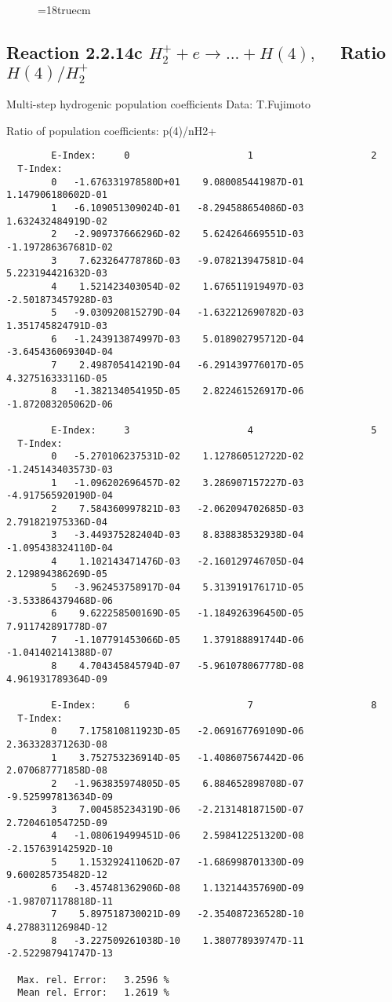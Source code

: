 \begin{figure} \label{2.2.14b}
\epsfxsize=18truecm
\end{figure}
\newpage

\subsection{
Reaction 2.2.14c $ H_2^+ + e \rightarrow ...+ H(4) , \quad  $
Ratio $H(4)/H_2^+  $
}

 Multi-step hydrogenic population coefficients
 Data: T.Fujimoto

 Ratio of population coefficients: p(4)/nH2+


\begin{verbatim}
        E-Index:     0                     1                     2
  T-Index:
        0   -1.676331978580D+01    9.080085441987D-01    1.147906180602D-01
        1   -6.109051309024D-01   -8.294588654086D-03    1.632432484919D-02
        2   -2.909737666296D-02    5.624264669551D-03   -1.197286367681D-02
        3    7.623264778786D-03   -9.078213947581D-04    5.223194421632D-03
        4    1.521423403054D-02    1.676511919497D-03   -2.501873457928D-03
        5   -9.030920815279D-04   -1.632212690782D-03    1.351745824791D-03
        6   -1.243913874997D-03    5.018902795712D-04   -3.645436069304D-04
        7    2.498705414219D-04   -6.291439776017D-05    4.327516333116D-05
        8   -1.382134054195D-05    2.822461526917D-06   -1.872083205062D-06

        E-Index:     3                     4                     5
  T-Index:
        0   -5.270106237531D-02    1.127860512722D-02   -1.245143403573D-03
        1   -1.096202696457D-02    3.286907157227D-03   -4.917565920190D-04
        2    7.584360997821D-03   -2.062094702685D-03    2.791821975336D-04
        3   -3.449375282404D-03    8.838838532938D-04   -1.095438324110D-04
        4    1.102143471476D-03   -2.160129746705D-04    2.129894386269D-05
        5   -3.962453758917D-04    5.313919176171D-05   -3.533864379468D-06
        6    9.622258500169D-05   -1.184926396450D-05    7.911742891778D-07
        7   -1.107791453066D-05    1.379188891744D-06   -1.041402141388D-07
        8    4.704345845794D-07   -5.961078067778D-08    4.961931789364D-09

        E-Index:     6                     7                     8
  T-Index:
        0    7.175810811923D-05   -2.069167769109D-06    2.363328371263D-08
        1    3.752753236914D-05   -1.408607567442D-06    2.070687771858D-08
        2   -1.963835974805D-05    6.884652898708D-07   -9.525997813634D-09
        3    7.004585234319D-06   -2.213148187150D-07    2.720461054725D-09
        4   -1.080619499451D-06    2.598412251320D-08   -2.157639142592D-10
        5    1.153292411062D-07   -1.686998701330D-09    9.600285735482D-12
        6   -3.457481362906D-08    1.132144357690D-09   -1.987071178818D-11
        7    5.897518730021D-09   -2.354087236528D-10    4.278831126984D-12
        8   -3.227509261038D-10    1.380778939747D-11   -2.522987941747D-13

  Max. rel. Error:   3.2596 %
  Mean rel. Error:   1.2619 %

\end{verbatim}
